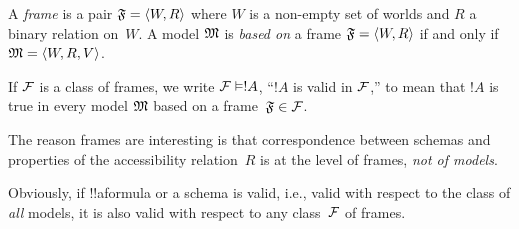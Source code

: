 \documentclass[../../../include/open-logic-section]{subfiles}
\begin{document}


\begin{defn}
  A \emph{frame} is a pair $\mathfrak F = \langle W,R \rangle$ where $W$ is a
  non-empty set of worlds and $R$ a binary relation on~$W$. A model
  $\mathfrak M$ is \emph{based on} a frame $\mathfrak F = \langle W,R \rangle$
  if and only if $\mathfrak M = \langle W, R, V \rangle$.
\end{defn}

\begin{defn}
  If $\mathcal{F}$ is a class of frames, we write $\mClass{F} \Entails
  !A$, ``$!A$ is valid in $\mathcal{F}$,'' to mean that $!A$ is true in
  every model $\mathfrak M$ based on a frame~$\mathfrak F \in
  \mathcal{F}$.
\end{defn}

The reason frames are interesting is that correspondence between
schemas and properties of the accessibility relation~$R$ is at the
level of frames, \emph{not of models}.

\begin{rem}
  Obviously, if !!a{formula} or a schema is valid, i.e., valid with
  respect to the class of \emph{all} models, it is also valid with
  respect to any  class~$\mathcal{F}$ of frames.
\end{rem}
\end{document}
